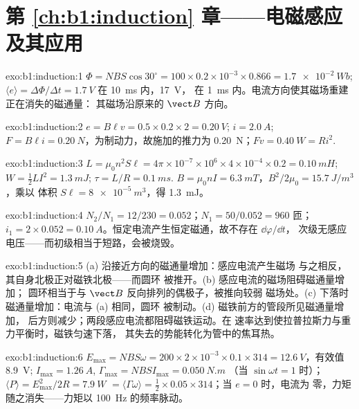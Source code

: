 \section*{第 \ref{ch:b1:induction} 章——电磁感应及其应用}

\begin{solution}{exo:b1:induction:1}
$\Phi = NBS\cos30^\circ = 100 \times 0.2 \times 10^{-3} \times 0.866 = \qty{1.7e-2}{Wb}$;
$\langle e\rangle = \Delta\Phi/\Delta t = \qty{1.7}{V}$ 在 \qty{10}{ms} 内，\qty{17}{V}，
在 \qty{1}{ms} 内。电流方向使其磁场重建正在消失的磁通量：
其磁场沿原来的 $\vect B$ 方向。
\end{solution}

\begin{solution}{exo:b1:induction:2}
$e = B\ell v = 0.5 \times 0.2 \times 2 = \qty{0.20}{V}$; $i = \qty{2.0}{A}$; $F = B\ell i =
\qty{0.20}{N}$，为制动力，故施加的推力为 \qty{0.20}{N}；$Fv = \qty{0.40}{W}
= Ri^2$.
\end{solution}

\begin{solution}{exo:b1:induction:3}
$L = \mu_0n^2S\ell = 4\pi \times 10^{-7} \times 10^6 \times 4 \times 10^{-4} \times 0.2 =
\qty{0.10}{mH}$; $W = \tfrac12LI^2 = \qty{1.3}{mJ}$; $\tau = L/R = \qty{0.1}{ms}$.
$B = \mu_0nI = \qty{6.3}{mT}$，$B^2/2\mu_0 = \qty{15.7}{J/m^3}$，乘以
体积 $S\ell = \qty{8e-5}{m^3}$，得 \qty{1.3}{mJ}。
\end{solution}

\begin{solution}{exo:b1:induction:4}
$N_2/N_1 = 12/230 = 0.052$；$N_1 = 50/0.052 = 960$ 匝；$i_1 = 2 \times 0.052 =
\qty{0.10}{A}$。恒定电流产生恒定磁通，故不存在 $\dd\varphi/\dd t$，
次级无感应电压——而初级相当于短路，会被烧毁。
\end{solution}

\begin{solution}{exo:b1:induction:5}
(a) 沿接近方向的磁通量增加：感应电流产生磁场
与之相反，其自身北极正对磁铁北极——而圆环
被推开。(b) 感应电流的磁场阻碍磁通量增加；
圆环相当于与 $\vect B$ 反向排列的偶极子，被推向较弱
磁场处。(c) 下落时磁通量增加：电流与 (a) 相同，圆环
被制动。(d) 磁铁前方的管段所见磁通量增加，
后方则减少；两段感应电流都阻碍磁铁运动。在
速率达到使拉普拉斯力与重力平衡时，磁铁匀速下落，
其失去的势能转化为管中的焦耳热。
\end{solution}

\begin{solution}{exo:b1:induction:6}
$E_{\max} = NBS\omega = 200 \times 2 \times 10^{-3} \times 0.1 \times 314 = \qty{12.6}{V}$，有效值
\qty{8.9}{V}; $I_{\max} = \qty{1.26}{A}$, $\Gamma_{\max} = NBSI_{\max} = \qty{0.050}{N.m}$
（当 $\sin\omega t = 1$ 时）；$\langle P\rangle = E_{\max}^2/2R = \qty{7.9}{W}$ $=
\langle\Gamma\omega\rangle = \tfrac12 \times 0.05 \times 314$；当 $e = 0$ 时，电流为
零，力矩随之消失——力矩以 \qty{100}{Hz} 的频率脉动。
\end{solution}

